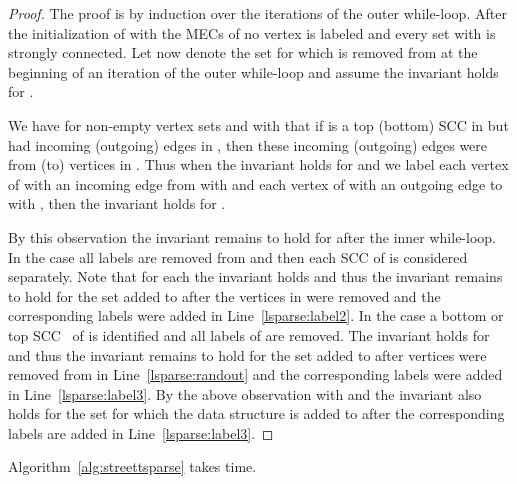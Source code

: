 \documentclass[11pt,letterpaper]{article}
\newcommand{\lu}{\textup{(}}
\newcommand{\ru}{\textup{)}\xspace}
\newcommand{\upbr}[1]{\lu #1\ru}
\begin{document}
\begin{proof}
	The proof is by induction over the iterations of the outer while-loop.
	After the initialization of  with the MECs of  no vertex is labeled
	and every set  with  is strongly connected.
	Let now  denote the set for which  is removed from  
	at the beginning of an iteration of the outer while-loop and assume the 
	invariant holds for .
	\begin{observation*}
	We have for non-empty vertex sets  and 
	with  that if  is a top \upbr{bottom} SCC in 
	but had incoming \upbr{outgoing} edges in , then these incoming 
	\upbr{outgoing} edges were from \upbr{to} vertices in . Thus when the 
	invariant holds for  and
	we label each vertex of  with an incoming edge from  with  and 
	each vertex of  with an outgoing edge to  with , then the invariant
	holds for .
	\end{observation*}
	By this observation the invariant remains to hold for  after the inner 
	while-loop.
	In the case 
	all labels are removed from  and then each SCC  of  is 
	considered separately. Note that for each  the invariant holds
	and thus the invariant remains to hold for the set  added to  after 
	the vertices in  were removed and the corresponding labels were added in 
	Line~\ref{lsparse:label2}.
	In the case 
	a bottom or top SCC~ of  is identified and all labels
	of  are removed. The invariant holds for  and thus the invariant remains 
	to hold for the set  added to  after 
	vertices were removed from  in Line~\ref{lsparse:randout}
	and the corresponding labels were added in Line~\ref{lsparse:label3}.
	By the above observation with  and 
	the invariant also holds for the set 
	for which the data structure is added to  after the corresponding
	labels are added in Line~\ref{lsparse:label3}.
\end{proof}

\begin{proposition}
	Algorithm~\ref{alg:streettsparse} takes  time.
\end{proposition}
\end{document}
